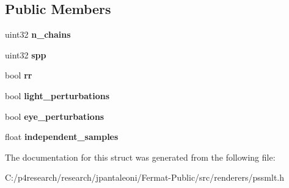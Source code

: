 \subsection*{Public Members}
\begin{DoxyCompactItemize}
\item 
\mbox{\label{struct_p_s_s_m_l_t_options_a65af2e4f8a2137b2387a4bdf314c58f8}} 
uint32 {\bfseries n\+\_\+chains}
\item 
\mbox{\label{struct_p_s_s_m_l_t_options_aa2ceb87e5d537eb9becd07d681b37bac}} 
uint32 {\bfseries spp}
\item 
\mbox{\label{struct_p_s_s_m_l_t_options_a38aeca74b82dec905665939018a836f2}} 
bool {\bfseries rr}
\item 
\mbox{\label{struct_p_s_s_m_l_t_options_a706de9448323a5c1a3cea77b4e147c6f}} 
bool {\bfseries light\+\_\+perturbations}
\item 
\mbox{\label{struct_p_s_s_m_l_t_options_ac2cb433a2e2ec39e302bea8acde833e4}} 
bool {\bfseries eye\+\_\+perturbations}
\item 
\mbox{\label{struct_p_s_s_m_l_t_options_a910c02c514038fa878c0ba3c1af42ba2}} 
float {\bfseries independent\+\_\+samples}
\end{DoxyCompactItemize}


The documentation for this struct was generated from the following file\+:\begin{DoxyCompactItemize}
\item 
C\+:/p4research/research/jpantaleoni/\+Fermat-\/\+Public/src/renderers/pssmlt.\+h\end{DoxyCompactItemize}
